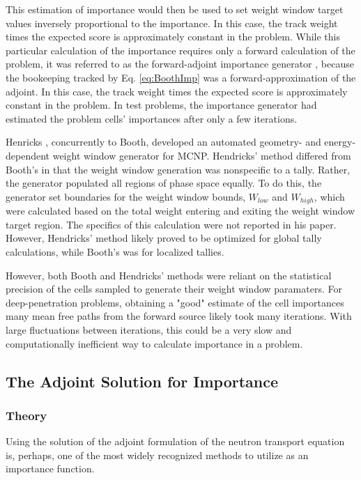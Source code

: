 This estimation of importance would then be used to set
weight window target values inversely proportional to the importance.
In this case, the track weight times the expected score is approximately
constant in the problem.
While this
particular calculation of the importance requires only a forward calculation of
the problem, it was referred to as the forward-adjoint importance generator
\cite{booth_automatic_1982, booth_deep_1982, booth_importance_1984}, because the
bookeeping tracked by Eq. \eqref{eq:BoothImp} was a forward-approximation of the
adjoint.
In this case, the track weight times the expected score is approximately
constant in the problem.
In test problems, the importance generator had estimated the problem cells'
importances after only a few iterations.

Henricks \cite{hendricks_code-generated_1982}, concurrently to Booth, developed
an automated geometry- and energy-dependent weight window generator for MCNP.
Hendricks' method differed from Booth's in that the weight window generation was
nonspecific to a tally.
Rather, the generator populated all regions of phase space equally.
To do this, the generator set boundaries for the weight window bounds, $W_{low}$
and $W_{high}$, which were calculated based on the total weight entering and
exiting the weight window target region. The specifics of this calculation were
not reported in his paper. However, Hendricks' method likely proved to be
optimized for global tally calculations, while Booth's was for localized
tallies.

However, both Booth and Hendricks' methods were reliant on the statistical
precision of the cells sampled to generate their weight window paramaters. For
deep-penetration problems, obtaining a "good" estimate of the cell importances
many mean free paths from the forward source likely took many iterations. With
large fluctuations between iterations, this could be a very slow and
computationally inefficient way to calculate importance in a problem.

\subsection{The Adjoint Solution for Importance}
\label{sec:AdjointImportance}

\subsubsection{Theory}

Using the solution of the adjoint formulation of the neutron transport
equation is, perhaps, one of the most widely recognized methods to utilize as an
importance function.

